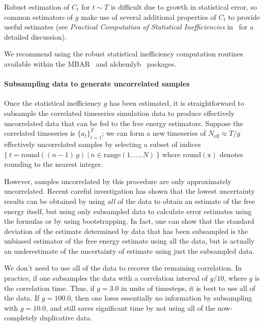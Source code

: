 \documentclass[9pt,bestpractices]{livecoms}
\begin{document}
Robust estimation of $C_t$ for $t \sim T$ is difficult due to growth in statistical error, so common estimators of $g$ make use of several additional properties of $C_t$ to provide useful estimates (see \emph{Practical Computation of Statistical Inefficiencies} in~\cite{chodera2016simple} for a detailed discussion).

We recommend using the robust statistical inefficiency computation routines available within the MBAR~\cite{kylebeauchamp2019choderalab} and alchemlyb~\cite{daviddotson2019alchemistry} packages.


\paragraph{Subsampling data to generate uncorrelated samples}
Once the statistical inefficiency $g$ has been estimated, it is straightforward to subsample the correlated timeseries simulation data to produce effectively uncorrelated data that can be fed to the free energy estimators.
Suppose the correlated timeseries is $\{a_t\}_{t=1}^T$; we can form a new timeseries of $N_{\mathrm{eff}} \approx T / g$ effectively uncorrelated samples by selecting a subset of indices $\{ \: t = \mathrm{round}((n-1) \, g) \: | \: n \in \mathrm{range}(1,\ldots ,N) \: \}$ where $\mathrm{round(x)}$ denotes rounding to the nearest integer.

However, samples uncorrelated by this procedure are only approximately uncorrelated.  Recent careful investigation has shown that the lowest uncertainty results can be obtained by using \textit{all} of the data to obtain an estimate of the free energy itself, but using only subsampled data to calculate error estimates using the formulas or by using bootstrapping.  In fact, one can show that the standard deviation of the estimate determined by data that has been subsampled is the unbiased estimator of the free energy estimate using all the data, but is actually an underestimate of the uncertainty of estimate
using just the subsampled data.

We don't need to use all of the data to recover the remaining correlation.  In practice, if one subsamples the data with a
correlation interval of $g/10$, where $g$ is the correlation time. Thus, if $g=3.0$ in units of timesteps, it is best to use all of the data.  If $g=100.0$, then one loses essentially no information by subsampling with $g=10.0$, and still saves significant time by not using all of the now-completely duplicative data.
\end{document}
